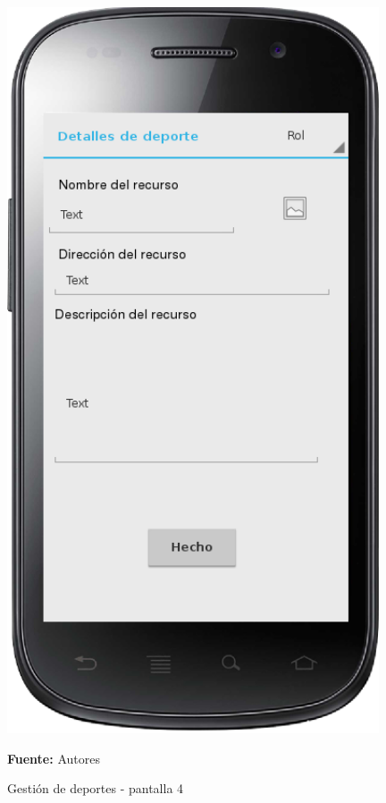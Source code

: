 \begin{figure}[!htb]
  \begin{center}
    \includegraphics[width=11cm]{./imagenes/UI/Deportes/gestion_deportes_4.png}
    \caption{Gestión de deportes - pantalla 4}
    \label{fig:gestion_deportes_4}
    \textbf{Fuente:}  Autores
  \end{center}
\end{figure}

